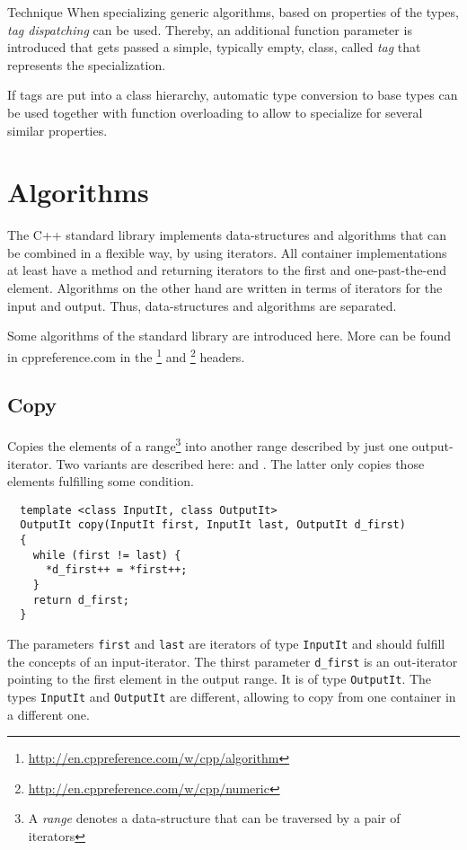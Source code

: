 \begin{guideline}{Technique}
  When specializing generic algorithms, based on properties of the types, \emph{tag dispatching} can be used.
  Thereby, an additional function parameter is introduced that gets passed a simple, typically empty, class,
  called \emph{tag} that represents the specialization.

  If tags are put into a class hierarchy, automatic type conversion to base types can be used together with
  function overloading to allow to specialize for several similar properties.
\end{guideline}


\section{Algorithms}
The C++ standard library implements data-structures and algorithms that can be combined in a flexible way, by using iterators. All container
implementations at least have a method  and  returning iterators to the first and one-past-the-end element.
Algorithms on the other hand are written in terms of iterators for the input and output. Thus, data-structures and algorithms are separated.

Some algorithms of the standard library are introduced here. More can be found in cppreference.com in the %
\footnote{\url{http://en.cppreference.com/w/cpp/algorithm}} and \footnote{\url{http://en.cppreference.com/w/cpp/numeric}} headers.


\subsection{Copy}
Copies the elements of a range\footnote{A \emph{range} denotes a data-structure that can be traversed by a pair of iterators} \cpp{[first, last)}
into another range described by just one output-iterator. Two variants are described here:  and . The latter
only copies those elements fulfilling some condition.
%
\begin{samepage}
\begin{verbatim}
  template <class InputIt, class OutputIt>
  OutputIt copy(InputIt first, InputIt last, OutputIt d_first)
  {
    while (first != last) {
      *d_first++ = *first++;
    }
    return d_first;
  }
\end{verbatim}
\end{samepage}
%
The parameters \texttt{first} and \texttt{last} are iterators of type \texttt{InputIt} and should fulfill the concepts of an input-iterator. The
thirst parameter \texttt{d\_first} is an out-iterator pointing to the first element in the output range. It is of type \texttt{OutputIt}. The
types \texttt{InputIt} and \texttt{OutputIt} are different, allowing to copy from one container in a different one.

